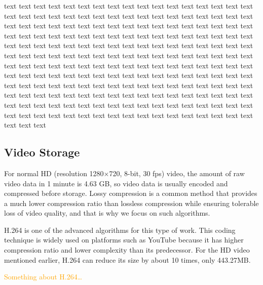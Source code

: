 \documentclass[sigconf]{acmart}
\begin{document}
{text text text text text text text text text text text text text text text text text text text text text text text text text text text text text text text text text text text text text text text text text text text text text text text text text text text text text text text text text text text text text text text text text text text text text text text text text text text text text text text text text text text text text text text text text text text text text text text text text text text text text text text text text text text text text text text text text text text text text text text text text text text text text text text text text text text text text text text text text text text text text text text text text text text text text text text text text text text text text text text text text text text text text text text text text text text text text text text text text text text text text text text text text text text text text text text text text text text text text text text text text text text text text text text }

\subsection{Video Storage}\label{video storage}
For normal HD (resolution 1280$\times$720, 8-bit, 30 fps) video, the amount of raw video data in 1 minute is 4.63 GB, so video data is usually encoded and compressed before storage. Lossy compression is a common method that provides a much lower compression ratio than lossless compression while ensuring tolerable loss of video quality, and that is why we focus on such algorithms.


H.264 is one of the advanced algorithms for this type of work. This coding technique is widely used on platforms such as YouTube because it has higher compression ratio and lower complexity than its predecessor. For the HD video mentioned earlier, H.264 can reduce its size by about 10 times, only 443.27MB.


\textcolor{orange}{Something about H.264\dots}
\end{document}
